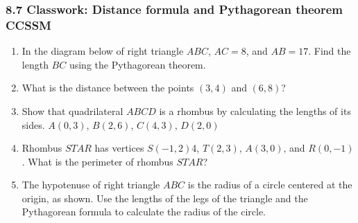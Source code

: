 \documentclass[12pt, twoside]{article}
\begin{document}
\subsubsection*{8.7 Classwork: Distance formula and Pythagorean theorem \hfill CCSSM}
\begin{enumerate}
\item In the diagram below of right triangle $ABC$, $AC=8$, and $AB=17$. Find the length $BC$ using the Pythagorean theorem.
\begin{flushright}
\end{flushright}

\item What is the distance between the points $(3,4)$ and $(6,8)$? \vspace{4cm}

\item Show that quadrilateral $ABCD$ is a rhombus by calculating the lengths of its sides. $A(0,3)$, $B(2,6)$, $C(4,3)$, $D(2,0)$
\begin{flushright}
\end{flushright}

\newpage
\item Rhombus $STAR$ has vertices $S(-1,2)$4, $T(2,3)$, $A(3,0)$, and $R(0,-1)$. What is the perimeter of rhombus $STAR$? \vspace{7cm}

\item The hypotenuse of right triangle $ABC$ is the radius of a circle centered at the origin, as shown. Use the lengths of the legs of the triangle and the Pythagorean formula to calculate the radius of the circle.
  \begin{flushright}
  \end{flushright}


\end{enumerate}
\end{document}
